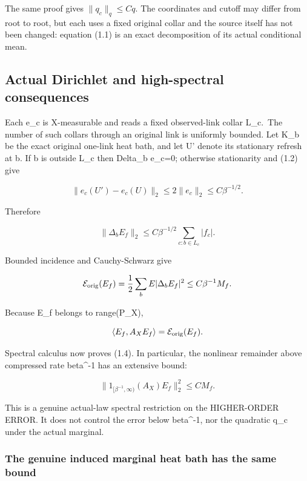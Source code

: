 \documentclass[
  11pt,
]{article}
\begin{document}
The same proof gives \(\|q_c\|_q\le Cq\). The coordinates and cutoff may
differ from root to root, but each uses a fixed original collar and the
source itself has not been changed: equation (1.1) is an exact
decomposition of its actual conditional mean.

\hypertarget{actual-dirichlet-and-high-spectral-consequences}{%
\subsection{Actual Dirichlet and high-spectral
consequences}\label{actual-dirichlet-and-high-spectral-consequences}}

Each e\_c is X-measurable and reads a fixed observed-link collar
L\_c.~The number of such collars through an original link is uniformly
bounded. Let K\_b be the exact original one-link heat bath, and let U'
denote its stationary refresh at b. If b is outside L\_c then Delta\_b
e\_c=0; otherwise stationarity and (1.2) give

\[
 \|e_c(U')-e_c(U)\|_2\le2\|e_c\|_2
 \le C\beta^{-1/2}.
\]

Therefore

\[
 \|\Delta_bE_f\|_2
 \le C\beta^{-1/2}\sum_{c:b\in L_c}|f_c|.
\]

Bounded incidence and Cauchy-Schwarz give

\[
 \mathcal E_{\rm orig}(E_f)
 =\frac12\sum_bE|\Delta_bE_f|^2
 \le C\beta^{-1}M_f.
\]

Because E\_f belongs to range(P\_X),

\[
 \langle E_f,A_XE_f\rangle=\mathcal E_{\rm orig}(E_f).
\]

Spectral calculus now proves (1.4). In particular, the nonlinear
remainder above compressed rate beta\^{}-1 has an extensive bound:

\[
 \|1_{[\beta^{-1},\infty)}(A_X)E_f\|_2^2\le CM_f.
\tag{7.1}
\]

This is a genuine actual-law spectral restriction on the HIGHER-ORDER
ERROR. It does not control the error below beta\^{}-1, nor the quadratic
q\_c under the actual marginal.

\hypertarget{the-genuine-induced-marginal-heat-bath-has-the-same-bound}{%
\subsubsection{The genuine induced marginal heat bath has the same
bound}\label{the-genuine-induced-marginal-heat-bath-has-the-same-bound}}
\end{document}
